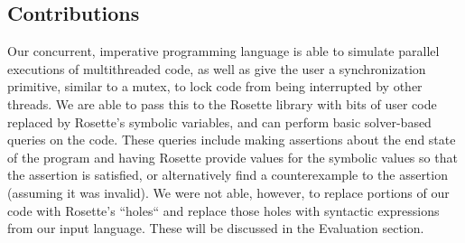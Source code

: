 \subsection{Contributions}
Our concurrent, imperative programming language is able to simulate parallel executions of multithreaded code, as well as give the user a synchronization primitive, similar to a mutex, to lock code from being interrupted by other threads.  We are able to pass this to the Rosette library with bits of user code replaced by Rosette's symbolic variables, and can perform basic solver-based queries on the code.  These queries include making assertions about the end state of the program and having Rosette provide values for the symbolic values so that the assertion is satisfied, or alternatively find a counterexample to the assertion (assuming it was invalid).  We were not able, however, to replace portions of our code with Rosette's ``holes`` and replace those holes with syntactic expressions from our input language.  These will be discussed in the Evaluation section.
